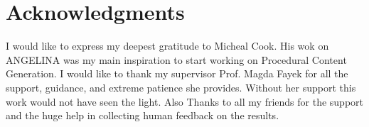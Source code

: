 \documentclass[letterpaper]{article}
\begin{document}
\section{Acknowledgments}
I would like to express my deepest gratitude to Micheal Cook. His wok on ANGELINA was my main inspiration to start working on Procedural Content Generation. I would like to thank my supervisor Prof. Magda Fayek for all the support, guidance, and extreme patience she provides. Without her support this work would not have seen the light. Also Thanks to all my friends for the support and the huge help in collecting human feedback on the results.



\end{document}
